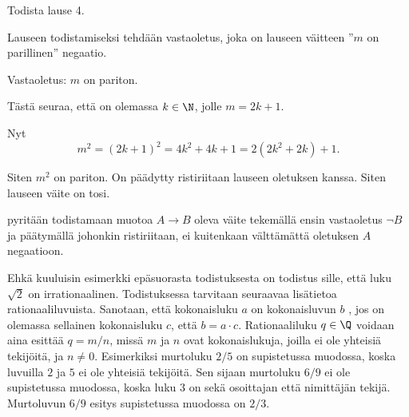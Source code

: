 
\begin{esimerkki}
	Todista lause 4.

	\begin{todistus}
		Lauseen todistamiseksi tehdään vastaoletus, joka on lauseen väitteen ''$m$ on parillinen'' negaatio.

		Vastaoletus: $m$ on pariton.

		Tästä seuraa, että on olemassa $k\in \N$, jolle $m=2k+1$.

		Nyt
		\[
			m^2 = (2k+1)^2 = 4k^2+4k+1 = 2(2k^2+2k)+1.
		\]

		Siten $m^2$ on pariton. On päädytty ristiriitaan lauseen oletuksen kanssa. Siten lauseen väite on tosi.
	\end{todistus}
\end{esimerkki}

 pyritään todistamaan muotoa $A\to B$ oleva
väite tekemällä ensin vastaoletus $\lnot B$ ja päätymällä johonkin ristiriitaan, ei kuitenkaan
välttämättä oletuksen $A$ negaatioon.

Ehkä kuuluisin esimerkki epäsuorasta todistuksesta on todistus sille, että luku $\sqrt{2}$ on irrationaalinen. 
Todistuksessa tarvitaan seuraavaa lisätietoa rationaaliluvuista. Sanotaan, että kokonaisluku $a$ on kokonaisluvun $b$ 
, jos on olemassa sellainen kokonaisluku $c$, että $b=a\cdot c$. Rationaaliluku $q\in\Q$ voidaan 
aina esittää  $q=m/n$, missä $m$ ja $n$ ovat kokonaislukuja, joilla ei 
ole yhteisiä tekijöitä, ja $n\neq 0$. Esimerkiksi murtoluku $2/5$ on supistetussa muodossa, koska luvuilla $2$ ja $5$ 
ei ole yhteisiä tekijöitä. Sen sijaan murtoluku $6/9$ ei ole supistetussa muodossa, koska luku $3$ on sekä osoittajan 
että nimittäjän tekijä. Murtoluvun $6/9$ esitys supistetussa muodossa on $2/3$.


